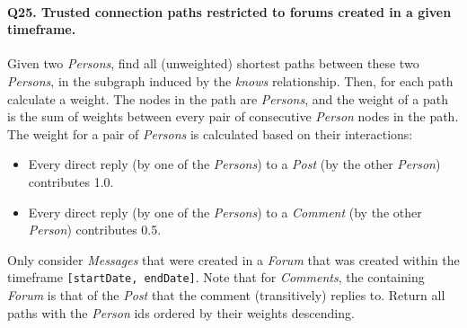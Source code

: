 \paragraph{\textbf{Q25}. Trusted connection paths restricted to forums created in a given timeframe.}
Given two \emph{Persons}, find all (unweighted) shortest paths between
these two \emph{Persons}, in the subgraph induced by the \emph{knows}
relationship.
Then, for each path calculate a weight. The nodes in the path are
\emph{Persons}, and the weight of a path is the sum of weights between
every pair of consecutive \emph{Person} nodes in the path.
The weight for a pair of \emph{Persons} is calculated based on their
interactions:
\begin{itemize}
\tightlist
\item
  Every direct reply (by one of the \emph{Persons}) to a \emph{Post} (by
  the other \emph{Person}) contributes 1.0.
\item
  Every direct reply (by one of the \emph{Persons}) to a \emph{Comment}
  (by the other \emph{Person}) contributes 0.5.
\end{itemize}
Only consider \emph{Messages} that were created in a \emph{Forum} that
was created within the timeframe \texttt{{[}startDate,\ endDate{]}}.
Note that for \emph{Comments}, the containing \emph{Forum} is that of
the \emph{Post} that the comment (transitively) replies to.
Return all paths with the \emph{Person} ids ordered by their weights
descending.

